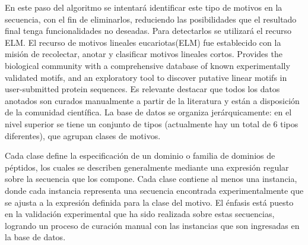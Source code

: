 En este paso del algoritmo se intentará identificar este tipo de motivos en la secuencia, con el fin de eliminarlos, reduciendo las posibilidades que el resultado final tenga funcionalidades no deseadas. 
Para detectarlos se utilizará el recurso ELM.
El recurso de motivos lineales eucariotas(ELM) \cite{puntervoll2003elm,dinkel2013eukaryotic} fue establecido con la misión de recolectar, anotar y clasificar motivos lineales cortos. 
Provides the biological community with a comprehensive database of known experimentally validated motifs, and an exploratory tool to discover putative linear motifs in user-submitted protein sequences.
Es relevante destacar que todos los datos anotados son curados manualmente a partir de la literatura y están a disposición de la comunidad científica.
La base de datos se organiza jerárquicamente: en el nivel superior se tiene un conjunto de tipos (actualmente hay un total de 6 tipos diferentes), que agrupan clases de motivos. 

Cada clase define la especificación de un dominio o familia de dominios de péptidos, los cuales se describen generalmente mediante una expresión regular sobre la secuencia que los compone.
Cada clase contiene al menos una instancia, donde cada instancia representa una secuencia encontrada experimentalmente que se ajusta a la expresión definida para la clase del motivo.
El énfasis está puesto en la validación experimental que ha sido realizada sobre estas secuencias, logrando un proceso de curación manual con las instancias que son ingresadas en la base de datos. 


